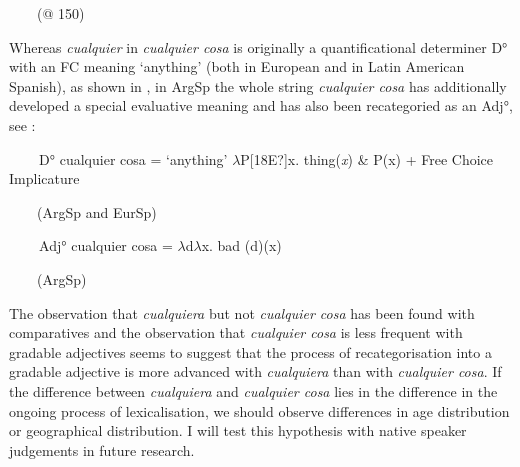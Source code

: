 \begin{styleStandard}
\ \ \ \ (@ 150)
\end{styleStandard}

\begin{styleStandard}
Whereas \textit{cualquier }in \textit{cualquier cosa} is originally a quantificational determiner D° with an FC meaning ‘anything’ (both in European and in Latin American Spanish), as shown in , in ArgSp the whole string \textit{cualquier cosa} has additionally developed a special evaluative meaning and has also been recategoried as an Adj°, see :
\end{styleStandard}

\begin{styleStandard}
\label{bkm:Ref150787837}\textbf{\ \ }\ \ D° cualquier cosa = ‘anything’ $\lambda $P[18E?]x. thing(\textit{x}) \& P(x) + Free Choice Implicature
\end{styleStandard}

\begin{styleStandard}
\ \ \ \ (ArgSp and EurSp) 
\end{styleStandard}

\begin{styleStandard}
\label{bkm:Ref150787813}\textbf{\ \ }\ \ Adj° cualquier cosa = $\lambda $d$\lambda $x. bad (d)(x)
\end{styleStandard}

\begin{styleStandard}
\ \ \ \ (ArgSp) 
\end{styleStandard}

\begin{styleStandard}
The observation that \textit{cualquiera} but not \textit{cualquier cosa} has been found with comparatives and the observation that \textit{cualquier cosa} is less frequent with gradable adjectives seems to suggest that the process of recategorisation into a gradable adjective is more advanced with \textit{cualquiera} than with \textit{cualquier cosa}. If the difference between \textit{cualquiera} and \textit{cualquier cosa} lies in the difference in the ongoing process of lexicalisation, we should observe differences in age distribution or geographical distribution. I will test this hypothesis with native speaker judgements in future research. 
\end{styleStandard}

